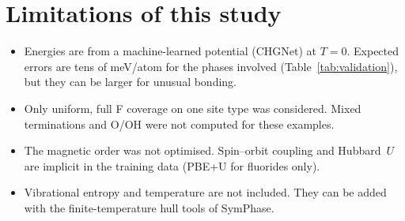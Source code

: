 \documentclass[11pt,a4paper]{article}
\begin{document}
\section{Limitations of this study}
\begin{itemize}
\item Energies are from a machine-learned potential (CHGNet) at $T=0$. Expected errors are tens of meV/atom for the phases involved
(Table~\ref{tab:validation}), but they can be larger for unusual bonding.
\item Only uniform, full F coverage on one site type was considered. Mixed terminations and O/OH were not computed for these examples.
\item The magnetic order was not optimised. Spin–orbit coupling and Hubbard~$U$ are implicit in the training data (PBE+U for fluorides only).
\item Vibrational entropy and temperature are not included. They can be added with the finite-temperature hull tools of SymPhase.
\end{itemize}

\appendix
\end{document}
